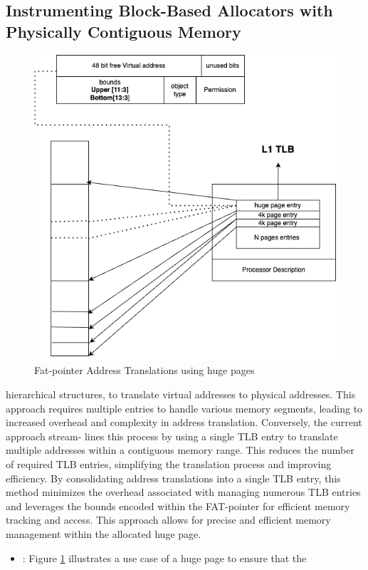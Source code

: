 \documentclass[11pt]{article}
\begin{document}
\subsection{Instrumenting Block-Based Allocators with Physically Contiguous Memory}
\label{sec:org33dc8de}
\begin{figure}[htbp]
\centering
\includegraphics[width=.9\linewidth]{diagram/hugepages.drawio.png}
\caption{\label{fig:org26a2828}Fat-pointer Address Translations using huge pages}
\end{figure}

hierarchical structures, to translate virtual addresses to physical addresses. This approach requires multiple entries to handle various
memory segments, leading to increased overhead and complexity
in address translation. Conversely, the current approach stream-
lines this process by using a single TLB entry to translate multiple
addresses within a contiguous memory range. This reduces the
number of required TLB entries, simplifying the translation process
and improving efficiency. By consolidating address translations into
a single TLB entry, this method minimizes the overhead associated
with managing numerous TLB entries and leverages the bounds
encoded within the FAT-pointer for efficient memory tracking and
access. This approach allows for precise and efficient memory management within the allocated huge page.

\begin{itemize}
\item\relax [ ]: Figure \ref{fig:org26a2828} illustrates a use case of a huge page to ensure that the
\end{itemize}
\end{document}
